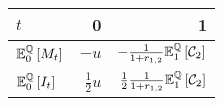 \documentclass[main.tex]{subfiles}
\begin{document}
            \begin{table}[H]
                \centering
                \begin{tabular}{l|rr}
                    $t$ & 0 & 1 \\
                    \hline
                    \rule{0pt}{1.3em}
                    $\mathbb{E}_{0}^{\mathbb{Q}}\left[M_t\right]$ & $-u$ & $-\frac{1}{1+r_{1,2}}\mathbb{E}_{1}^{\mathbb{Q}}\left[\mathcal{C}_{2}\right]$ \\
                    \rule{0pt}{1.3em}
                    $\mathbb{E}_{0}^{\mathbb{Q}}\left[I_t\right]$ & $\frac{1}{2}u$ & $\frac{1}{2}\frac{1}{1+r_{1,2}}\mathbb{E}_{1}^{\mathbb{Q}}\left[\mathcal{C}_{2}\right]$ \\
                \end{tabular}
                \caption{}
                \label{tbl:swap-margin-postings}
            \end{table}
\end{document}
